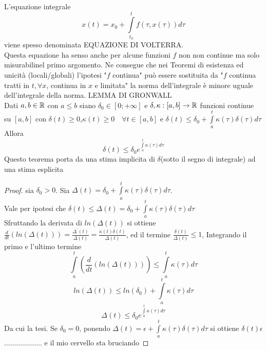 \observation
L'equazione integrale 
$$x(t)=x_0+\int\limits_{t_0}^{t}f(\tau,x(\tau))d\tau$$
viene spesso denominata EQUAZIONE DI VOLTERRA.\\
Questa equazione ha senso anche per alcune funzioni $f$ non non continue ma solo misurabilinel primo argomento. Ne consegue che nei Teoremi di esistenza ed unicità (locali/globali) l'ipotesi "$f$ continua" può essere sostituita da "$f$ continua tratti in $t, \forall x$, continua in $x$ e limitata"
\observation
la norma dell'integrale è minore uguale dell'integrale della norma.
\proposition LEMMA DI GRONWALL\\
Dati $a,b\in \mathbb{R}$ con $a\le b$ siano $\delta_0\in \left[ 0;+\infty \right]$ e $\delta,\kappa:\left[a,b\right]\to \mathbb{R}$ funzioni continue su $\left[a,b\right]$ con $\delta(t)\ge 0$,$\kappa(t)\ge 0 \quad \forall t\in\left[ a,b\right] $ e $\delta(t)\le \delta_0+\int\limits_{a}^{t}\kappa(\tau)\delta(\tau)d\tau$Allora $$\delta(t)\le\delta_0e^{\int\limits_a^t\kappa(\tau)d\tau}$$
Questo teorema porta da una stima implicita di $\delta$(sotto il segno di integrale) ad una stima esplicita 
\begin{proof}
	sia $\delta_0 > 0$. Sia $\Delta(t)=\delta_0+\int\limits_a^t\kappa(\tau)\delta(\tau)d\tau$.\\
	Vale per ipotesi che $\delta(t)\le\Delta(t)=\delta_0+\int\limits_a^t\kappa(\tau)\delta(\tau)d\tau$\\
	Sfruttando la derivata di $ln(\Delta(t))$ si ottiene $\frac{d}{dt}(ln(\Delta(t)))= \frac{\Delta^{'}(t)}{\Delta(t)}=\frac{\kappa(t)\delta(t)}{\Delta(t)}$, ed il termine $\frac{\delta(t)}{\Delta(t)}\le 1$, Integrando il primo e l'ultimo termine
	$$\int\limits_a^t\left( \frac{d}{dt}\left(ln(\Delta(t))\right) \right)\le\int\limits_a^t\kappa(\tau)d\tau$$
	$$ln(\Delta(t))\le ln(\delta_0)+\int\limits_a^t\kappa(\tau)d\tau$$
	$$ \Delta(t)\le\delta_0e^{\int\limits_a^t\kappa(\tau)d\tau} $$
	Da cui la tesi.
	Se $\delta_0=0$, ponendo $\Delta(t)=\epsilon+\int\limits_a^t\kappa(\tau)\delta(\tau)d\tau$ si ottiene $\delta(t)\epsilon$ ................... e il mio cervello sta bruciando
\end{proof}

